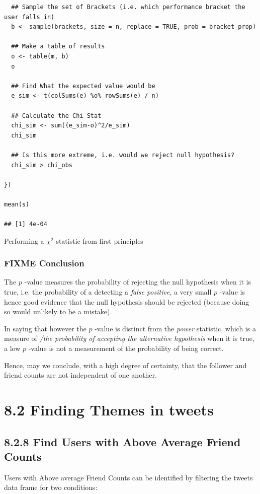 \documentclass[11pt]{article}
\begin{document}
\begin{enumerate}
\begin{enumerate}
\begin{listing}[htbp]
\begin{verbatim}
  ## Sample the set of Brackets (i.e. which performance bracket the user falls in)
  b <- sample(brackets, size = n, replace = TRUE, prob = bracket_prop)

  ## Make a table of results
  o <- table(m, b)
  o

  ## Find What the expected value would be
  e_sim <- t(colSums(e) %o% rowSums(e) / n)

  ## Calculate the Chi Stat
  chi_sim <- sum((e_sim-o)^2/e_sim)
  chi_sim

  ## Is this more extreme, i.e. would we reject null hypothesis?
  chi_sim > chi_obs

})

mean(s)

## [1] 4e-04
\end{verbatim}
\caption{\label{org81dbafa}Performing a \(\chi^{2}\) statistic from first principles}
\end{listing}
\end{enumerate}
\end{enumerate}
\subsubsection{{\bfseries\sffamily FIXME} Conclusion}
\label{sec:org354c9c2}
The \(p\) -value measures the probability of rejecting the null hypothesis when it is true, i.e. the probability of a detecting a \emph{false positive}, a very small \(p\) -value is hence good evidence that the null hypothesis should be rejected (because doing so would unlikely to be a mistake).

In saying that however the \(p\) -value is distinct from the \emph{power} statistic, which is a measure of \emph{/the probability of accepting the alternative hypothesis} when it is true, a low \(p\) -value is not a measurement of the probability of being correct.

Hence, may we conclude, with a high degree of certainty, that the follower and friend counts are not independent of one another.
\section{8.2 Finding Themes in tweets}
\label{sec:orgf4ba33d}
\subsection{8.2.8 Find Users with Above Average Friend Counts}
\label{sec:org98f87ea}
Users with Above average Friend Counts can be identified by filtering the tweets
data frame for two conditions:
\end{document}
